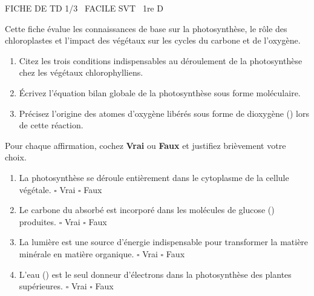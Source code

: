 \documentclass[11pt]{article}
\begin{document}
\begin{tcolorbox}[enhanced,colback=popink,colframe=popink,arc=10pt,boxrule=0pt,left=12pt,right=12pt,top=9pt,bottom=9pt]
{\color{white}\popxbold\small FICHE DE TD 1/3 \textbullet\ FACILE \hfill SVT \textbullet\ 1re D\par}
\end{tcolorbox}
\vspace{4pt}
Cette fiche évalue les connaissances de base sur la photosynthèse, le rôle des chloroplastes et l'impact des végétaux sur les cycles du carbone et de l'oxygène.

\begin{exercice}
\begin{enumerate}
    \item Citez les trois conditions indispensables au déroulement de la photosynthèse chez les végétaux chlorophylliens.
    \item Écrivez l'équation bilan globale de la photosynthèse sous forme moléculaire.
    \item Précisez l'origine des atomes d'oxygène libérés sous forme de dioxygène () lors de cette réaction.
\end{enumerate}
\end{exercice}

\begin{exercice}
Pour chaque affirmation, cochez \textbf{Vrai} ou \textbf{Faux} et justifiez brièvement votre choix.
\begin{enumerate}
    \item La photosynthèse se déroule entièrement dans le cytoplasme de la cellule végétale. \hfill $\square$ Vrai \quad $\square$ Faux
    \item Le carbone du  absorbé est incorporé dans les molécules de glucose () produites. \hfill $\square$ Vrai \quad $\square$ Faux
    \item La lumière est une source d'énergie indispensable pour transformer la matière minérale en matière organique. \hfill $\square$ Vrai \quad $\square$ Faux
    \item L'eau () est le seul donneur d'électrons dans la photosynthèse des plantes supérieures. \hfill $\square$ Vrai \quad $\square$ Faux
\end{enumerate}
\end{exercice}
\end{document}
